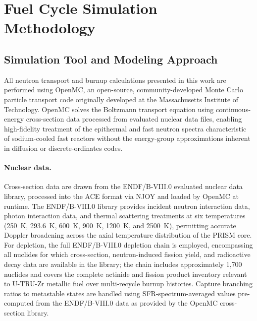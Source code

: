 \documentclass[10pt,twoside]{article}
\begin{document}
\section{Fuel Cycle Simulation Methodology}

\subsection{Simulation Tool and Modeling Approach}

All neutron transport and burnup calculations presented in this work are
performed using OpenMC, an open-source, community-developed Monte Carlo
particle transport code originally developed at the Massachusetts Institute
of Technology.\cite{Romano2013,Romano2021}  OpenMC solves the Boltzmann
transport equation using continuous-energy cross-section data processed
from evaluated nuclear data files, enabling high-fidelity treatment of the
epithermal and fast neutron spectra characteristic of sodium-cooled fast
reactors without the energy-group approximations inherent in diffusion or
discrete-ordinates codes.

\paragraph{Nuclear data.}
Cross-section data are drawn from the ENDF/B-VIII.0 evaluated nuclear data
library,\cite{Brown2018} processed into the ACE format via NJOY and loaded
by OpenMC at runtime.  The ENDF/B-VIII.0 library provides incident neutron
interaction data, photon interaction data, and thermal scattering treatments
at six temperatures (250~K, 293.6~K, 600~K,
900~K, 1200~K, and 2500~K), permitting accurate Doppler broadening
across the axial temperature distribution of the PRISM core.  For depletion, the full ENDF/B-VIII.0
depletion chain is employed, encompassing all nuclides for which
cross-section, neutron-induced fission yield, and radioactive decay data
are available in the library; the chain includes approximately 1,700 nuclides
and covers the complete actinide and fission product inventory relevant to
U-TRU-Zr metallic fuel over multi-recycle burnup histories.  Capture
branching ratios to metastable states are handled using SFR-spectrum-averaged
values pre-computed from the ENDF/B-VIII.0 data as provided by the
OpenMC cross-section library.\cite{OpenMC_data}
\end{document}
